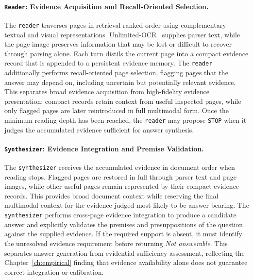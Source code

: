 \documentclass[11pt,twoside,openany]{report}
\begin{document}
\paragraph{\texttt{Reader}: Evidence Acquisition and Recall-Oriented Selection.}
The \texttt{reader} traverses pages in retrieval-ranked order using complementary textual and visual representations. Unlimited-OCR~\cite{yin2026unlimited} supplies parser text, while the page image preserves information that may be lost or difficult to recover through parsing alone. Each turn distils the current page into a compact evidence record that is appended to a persistent evidence memory. The \texttt{reader} additionally performs recall-oriented page selection, flagging pages that the answer may depend on, including uncertain but potentially relevant evidence. This separates broad evidence acquisition from high-fidelity evidence presentation: compact records retain context from useful inspected pages, while only flagged pages are later reintroduced in full multimodal form. Once the minimum reading depth has been reached, the \texttt{reader} may propose \texttt{STOP} when it judges the accumulated evidence sufficient for answer synthesis.

\paragraph{\texttt{Synthesizer}: Evidence Integration and Premise Validation.}
The \texttt{synthesizer} receives the accumulated evidence in document order when reading stops. Flagged pages are restored in full through parser text and page images, while other useful pages remain represented by their compact evidence records. This provides broad document context while reserving the final multimodal context for the evidence judged most likely to be answer-bearing. The \texttt{synthesizer} performs cross-page evidence integration to produce a candidate answer and explicitly validates the premises and presuppositions of the question against the supplied evidence. If the required support is absent, it must identify the unresolved evidence requirement before returning \emph{Not answerable}. This separates answer generation from evidential sufficiency assessment, reflecting the Chapter~\ref{ch:empirical} finding that evidence availability alone does not guarantee correct integration or calibration.
\end{document}
